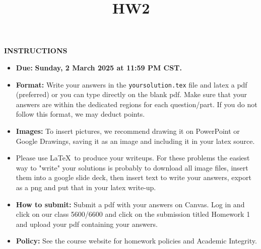 \documentclass[twoside]{article}
\title{HW2}
\begin{document}
\thispagestyle{empty}



\maketitle 
\smallskip
\smallskip
\textbf{INSTRUCTIONS}

\begin{itemize}
\item \textbf{Due:} \textbf{Sunday, 2 March 2025 at 11:59 PM CST.} 
\item \textbf{Format:} Write your answers in the \texttt{yoursolution.tex} file and latex a pdf (preferred) or you can type directly on the blank pdf. Make sure that your answers are within the dedicated regions for each question/part. If you do not follow this format, we may deduct points. 
\item \textbf{Images:} To insert pictures, we recommend drawing it on PowerPoint or Google Drawings, saving it as an image and including it in your latex source.

\item Please use \LaTeX\ to produce your writeups. For these problems the easiest way to "write" your solutions is probably to download all image files, insert them into a google slide deck, then insert text to write your answers, export as a png and put that in your latex write-up.

\item \textbf{How to submit:} Submit a pdf with your answers on Canvas. Log in and click on our class 5600/6600 and click on the submission titled Homework 1 and upload your pdf containing your answers. 
\item \textbf{Policy:} See the course website for homework policies and Academic Integrity.

\end{itemize}
\end{document}

